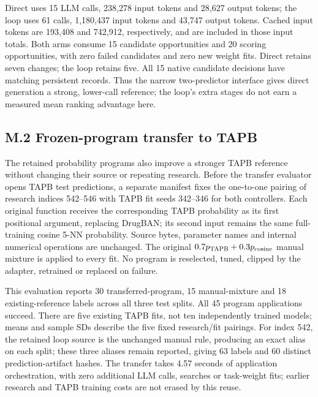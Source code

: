 Direct uses 15 LLM calls, 238,278 input tokens and 28,627 output tokens; the loop uses 61 calls, 1,180,437 input tokens and 43,747 output tokens. Cached input tokens are 193,408 and 742,912, respectively, and are included in those input totals. Both arms consume 15 candidate opportunities and 20 scoring opportunities, with zero failed candidates and zero new weight fits. Direct retains seven changes; the loop retains five. All 15 native candidate decisions have matching persistent records. Thus the narrow two-predictor interface gives direct generation a strong, lower-call reference; the loop's extra stages do not earn a measured mean ranking advantage here.

\subsection*{M.2 Frozen-program transfer to TAPB}
The retained probability programs also improve a stronger TAPB reference without changing their source or repeating research. Before the transfer evaluator opens TAPB test predictions, a separate manifest fixes the one-to-one pairing of research indices 542--546 with TAPB fit seeds 342--346 for both controllers. Each original function receives the corresponding TAPB probability as its first positional argument, replacing DrugBAN; its second input remains the same full-training cosine 5-NN probability. Source bytes, parameter names and internal numerical operations are unchanged. The original $0.7p_{\rm TAPB}+0.3p_{\rm cosine}$ manual mixture is applied to every fit. No program is reselected, tuned, clipped by the adapter, retrained or replaced on failure.

\begin{table}[htbp]

\end{table}

This evaluation reports 30 transferred-program, 15 manual-mixture and 18 existing-reference labels across all three test splits. All 45 program applications succeed. There are five existing TAPB fits, not ten independently trained models; means and sample SDs describe the five fixed research/fit pairings. For index 542, the retained loop source is the unchanged manual rule, producing an exact alias on each split; these three aliases remain reported, giving 63 labels and 60 distinct prediction-artifact hashes. The transfer takes 4.57 seconds of application orchestration, with zero additional LLM calls, searches or task-weight fits; earlier research and TAPB training costs are not erased by this reuse.

